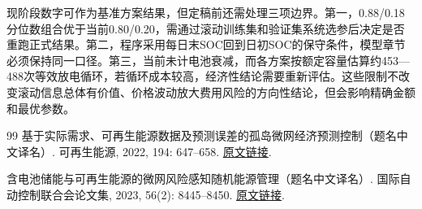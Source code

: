 \documentclass[UTF8,a4paper,12pt,fontset=fandol]{ctexart}
\numberwithin{equation}{section}
\begin{document}
现阶段数字可作为基准方案结果，但定稿前还需处理三项边界。第一，0.88/0.18分位数组合优于当前0.80/0.20，需通过滚动训练集和验证集系统选参后决定是否重跑正式结果。第二，程序采用每日末SOC回到日初SOC的保守条件，模型章节必须保持同一口径。第三，当前未计电池衰减，而各方案按额定容量估算约453---488次等效放电循环，若循环成本较高，经济性结论需要重新评估。这些限制不改变滚动信息总体有价值、价格波动放大费用风险的方向性结论，但会影响精确金额和最优参数。


\clearpage
\begin{thebibliography}{99}
基于实际需求、可再生能源数据及预测误差的孤岛微网经济预测控制（题名中文译名）.
可再生能源, 2022, 194: 647--658.
\href{https://doi.org/10.1016/j.renene.2022.05.103}{原文链接}.

含电池储能与可再生能源的微网风险感知随机能源管理（题名中文译名）.
国际自动控制联合会论文集, 2023, 56(2): 8445--8450.
\href{https://doi.org/10.1016/j.ifacol.2023.10.1042}{原文链接}.
\end{thebibliography}
\end{document}
